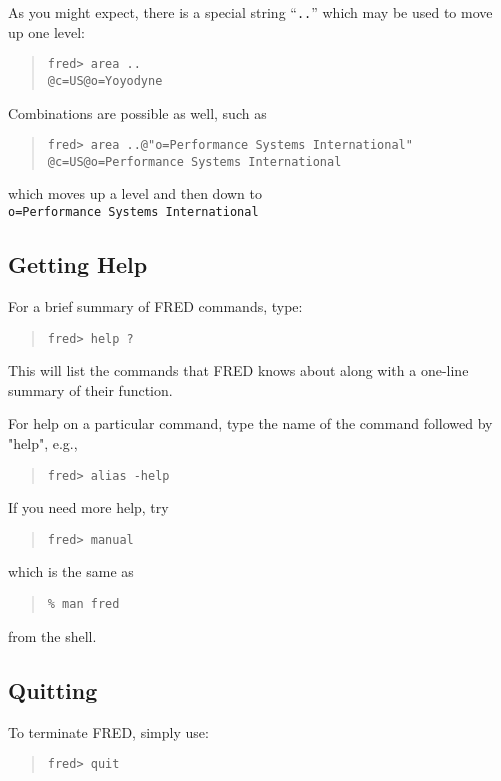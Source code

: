 As you might expect,
there is a special string ``\verb".."'' which may be used to move up one level:
\begin{quote}\small\begin{verbatim}
fred> area ..
@c=US@o=Yoyodyne
\end{verbatim}\end{quote}
Combinations are possible as well,
such as
\begin{quote}\small\begin{verbatim}
fred> area ..@"o=Performance Systems International"
@c=US@o=Performance Systems International
\end{verbatim}\end{quote}
which moves up a level and then down to\\
\verb"o=Performance Systems International"

\subsection	{Getting Help}
For a brief summary of FRED commands,
type:
\begin{quote}\small\begin{verbatim}
fred> help ?
\end{verbatim}\end{quote}
This will list the commands that FRED knows about
along with a one-line summary of their function.

For help on a particular command,
type the name of the command followed by \switch"help",
e.g.,
\begin{quote}\small\begin{verbatim}
fred> alias -help
\end{verbatim}\end{quote}

If you need more help,
try
\begin{quote}\small\begin{verbatim}
fred> manual
\end{verbatim}\end{quote}
which is the same as
\begin{quote}\small\begin{verbatim}
% man fred
\end{verbatim}\end{quote}
from the shell.

\subsection	{Quitting}
To terminate FRED,
simply use:
\begin{quote}\small\begin{verbatim}
fred> quit
\end{verbatim}\end{quote}


